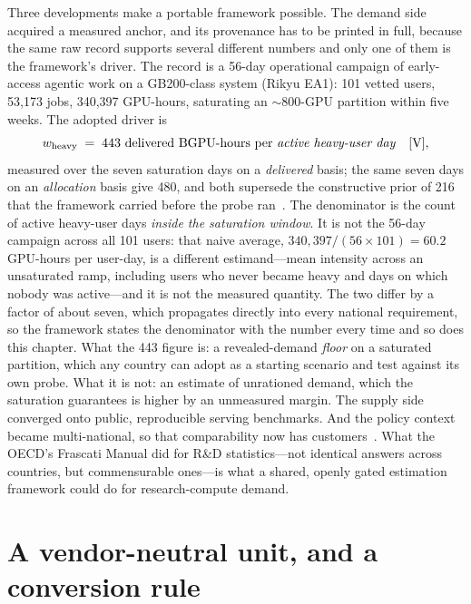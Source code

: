 Three developments make a portable framework possible. The demand side acquired a measured anchor, and its provenance has to be printed in full, because the same raw record supports several different numbers and only one of them is the framework's driver. The record is a 56-day operational campaign of early-access agentic work on a GB200-class system (Rikyu EA1): 101 vetted users, 53,173 jobs, 340,397 GPU-hours, saturating an $\sim$800-GPU partition within five weeks. The adopted driver is
\[
w_{\mathrm{heavy}} \;=\; 443 \ \text{delivered BGPU-hours per \emph{active heavy-user day}} \quad [\mathrm{V}],
\]
measured over the seven saturation days on a \emph{delivered} basis; the same seven days on an \emph{allocation} basis give 480, and both supersede the constructive prior of 216 that the framework carried before the probe ran~\cite{ai4s-framework}. The denominator is the count of active heavy-user days \emph{inside the saturation window}. It is not the 56-day campaign across all 101 users: that naive average, $340{,}397/(56\times101) = 60.2$ GPU-hours per user-day, is a different estimand---mean intensity across an unsaturated ramp, including users who never became heavy and days on which nobody was active---and it is not the measured quantity. The two differ by a factor of about seven, which propagates directly into every national requirement, so the framework states the denominator with the number every time and so does this chapter. What the 443 figure is: a revealed-demand \emph{floor} on a saturated partition, which any country can adopt as a starting scenario and test against its own probe. What it is not: an estimate of unrationed demand, which the saturation guarantees is higher by an unmeasured margin. The supply side converged onto public, reproducible serving benchmarks. And the policy context became multi-national, so that comparability now has customers~\cite{ai4s-framework}. What the OECD's Frascati Manual did for R\&D statistics---not identical answers across countries, but commensurable ones---is what a shared, openly gated estimation framework could do for research-compute demand.

\section{A vendor-neutral unit, and a conversion rule}

